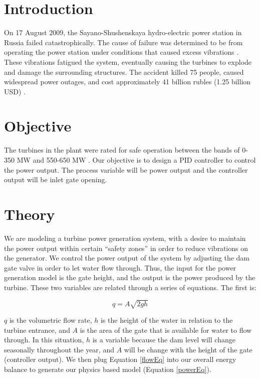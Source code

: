 \documentclass{article}
\begin{document}
    \begin{multicols*}{2}
        \newlength{\mywidth}
        \setlength{\mywidth}{\linewidth}
        \addtolength{\mywidth}{-0.5\columnsep}

        \section{Introduction}

        On 17 August 2009, the Sayano-Shushenskaya hydro-electric power station in Russia failed catastrophically.  The cause of failure was determined to be from operating the power station under conditions that caused excess vibrations \cite{SayanoAccidentUpdate}. These vibrations fatigued the system, eventually causing the turbines to explode and damage the surrounding structures. The accident killed 75 people, caused widespread power outages, and cost approximately 41 billion rubles (1.25 billion USD) \cite{sayanoDam}.
        
        \section{Objective}

        The turbines in the plant were rated for safe operation between the bands of 0-350 MW and 550-650 MW \cite{sayWiki}. Our objective is to design a PID controller to control the power output.  The process variable will be power output and the controller output will be inlet gate opening.

        \section{Theory}

        We are modeling a turbine power generation system, with a desire to maintain the power output within certain “safety zones” in order to reduce vibrations on the generator. We control the power output of the system by adjusting the dam gate valve in order to let water flow through. Thus, the input for the power generation model is the gate height, and the output is the power produced by the turbine. These two variables are related through a series of equations. The first is: 

        \begin{equation}\label{flowEq}
            q = A \sqrt{2gh}
        \end{equation}

        $q$ is the volumetric flow rate, $h$ is the height of the water in relation to the turbine entrance, and $A$ is the area of the gate that is available for water to flow through. In this situation, $h$ is a variable because the dam level will change seasonally throughout the year, and $A$ will be change with the height of the gate (controller output). We then plug Equation \ref{flowEq} into our overall energy balance to generate our physics based model (Equation \ref{powerEq}).


\end{multicols*}
\end{document}
